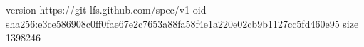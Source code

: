 version https://git-lfs.github.com/spec/v1
oid sha256:e3ce586908c0ff0fae67e2c7653a88fa58f4e1a220e02cb9b1127cc5fd460e95
size 1398246
